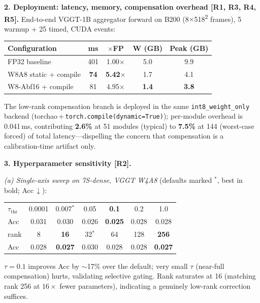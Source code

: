 \documentclass[9pt]{article}
\begin{document}
\smallskip
\noindent\textbf{2. Deployment: latency, memory, compensation overhead [R1, R3, R4, R5].}
End-to-end VGGT-1B aggregator forward on B200 (8$\times$518\textsuperscript{2} frames), 5 warmup + 25 timed, CUDA events:

\begin{center}\small
\begin{tabular}{lcccc}
\toprule
Configuration              & ms          & $\times$FP        & W (GB)      & Peak (GB) \\
\midrule
FP32 baseline              & 401         & 1.00$\times$      & 5.0         & 9.9 \\
W8A8 static + compile      & \textbf{74} & \textbf{5.42$\times$} & 1.7      & 4.1 \\
W8-Abf16 + compile         & 81          & 4.95$\times$      & \textbf{1.4}& \textbf{3.8} \\
\bottomrule
\end{tabular}
\end{center}

The low-rank compensation branch is deployed in the same \texttt{int8\_weight\_only} backend (torchao\,+\,\texttt{torch.compile(dynamic=True)}); per-module overhead is 0.041\,ms, contributing \textbf{2.6\%} at 51 modules (typical) to \textbf{7.5\%} at 144 (worst-case forced) of total latency---dispelling the concern that compensation is a calibration-time artifact only.

\smallskip
\noindent\textbf{3. Hyperparameter sensitivity [R2].}

\noindent\emph{(a) Single-axis sweep on 7S-dense, VGGT W4A8} (defaults marked $^\ast$, best in bold; Acc\,$\downarrow$):

\begin{center}\small
\begin{tabular}{lcccccc}
\toprule
$\tau_\text{thr}$ & 0.0001 & 0.007$^\ast$ & 0.05 & \textbf{0.1} & 0.2 & 1.0 \\
Acc               & 0.031  & 0.030        & 0.026 & \textbf{0.025} & 0.028 & 0.028 \\
\midrule
rank              & 8     & \textbf{16}    & 32$^\ast$ & 64 & 128 & \textbf{256} \\
Acc               & 0.028 & \textbf{0.027} & 0.030     & 0.028 & 0.028 & \textbf{0.027} \\
\bottomrule
\end{tabular}
\end{center}

$\tau{=}0.1$ improves Acc by $\sim$17\% over the default; very small $\tau$ (near-full compensation) hurts, validating selective gating. Rank saturates at 16 (matching rank 256 at $16\times$ fewer parameters), indicating a genuinely low-rank correction suffices.
\end{document}
